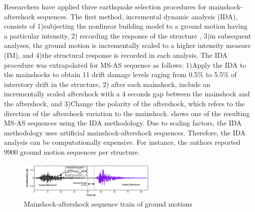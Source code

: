 Researchers have applied three earthquake selection procedures for mainshock-aftershock sequences. The first method, incremental dynamic analysis (IDA), consists of 1)subjecting the nonlinear building model to a ground motion having a particular intensity, 2) recording the response of the structure \cite{Vamvatsikos2002}, 3)in subsequent analyses, the ground motion is incrementally scaled to a higher intensity measure (IM), and 4)the structural response is recorded in each analysis. The IDA procedure was extrapolated for MS-AS sequence as follows: 1)Apply the IDA to the mainshocks to obtain 11 drift damage levels raging from 0.5\% to 5.5\% of interstory drift in the structure, 2) after each mainshock, include an incrementally scaled aftershock with a 4 seconds gap between the mainshock and the aftershock, and 3)Change the polarity of the aftershock, which refers to the direction of the aftershock variation to the mainshock.  shows one of the resulting MS-AS sequences using the IDA methodology. Due to scaling factors, the IDA methodology uses artificial mainshock-aftershock sequences. Therefore, the IDA analysis can be computationally expensive. For instance, the authors reported 9900 ground motion sequences per structure.

\begin{figure}[htbp]
\centering
\includegraphics[width=0.6\textwidth]{Chapter-2/figs/MS-AS_sequence_Luco}
\caption{Mainshock-aftershock sequence train of ground motions \cite{Raghunandan2015}}
\label{fig:MS-AS_Luco}
\end{figure}

